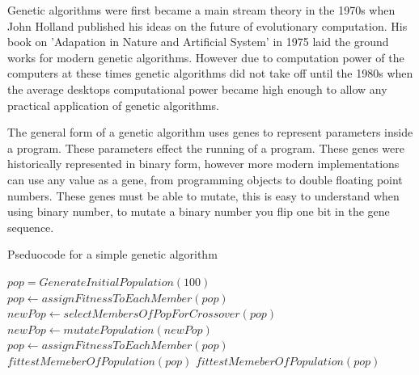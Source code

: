 \documentclass[12pt]{article}
\begin{document}
Genetic algorithms were first became a main stream theory in the 1970s when John Holland published his ideas on the future of evolutionary 
computation. His book on 'Adapation in Nature and Artificial System' in 1975 laid the ground works for modern genetic algorithms. However due to computation
power of the computers at these times genetic algorithms did not take off until the 1980s when the average desktops computational power became
high enough to allow any practical application of genetic algorithms.

The general form of a genetic algorithm uses genes to represent parameters inside a program.
These parameters effect the running of a program.
These genes were historically represented in binary form, however more modern implementations can use any value as a gene, from programming objects to double floating point numbers.
These genes must be able to mutate, this is easy to understand when using binary number, to mutate a binary number you flip one bit in the gene sequence. 

\begin{algorithm}
\caption{Pseduocode for a simple genetic algorithm}
\label{fig:garun}
\begin{algorithmic}

\State $pop = GenerateInitialPopulation(100)$
\State $pop \gets assignFitnessToEachMember(pop)$
	\State $newPop \gets selectMembersOfPopForCrossover(pop)$
	\State $newPop \gets mutatePopulation(newPop)$
	\State $pop \gets assignFitnessToEachMember(pop)$
		\State \Return $fittestMemeberOfPopulation(pop)$
	\EndIf
\EndWhile
\State \Return $fittestMemeberOfPopulation(pop)$


\end{algorithmic}
\end{algorithm}
\end{document}
